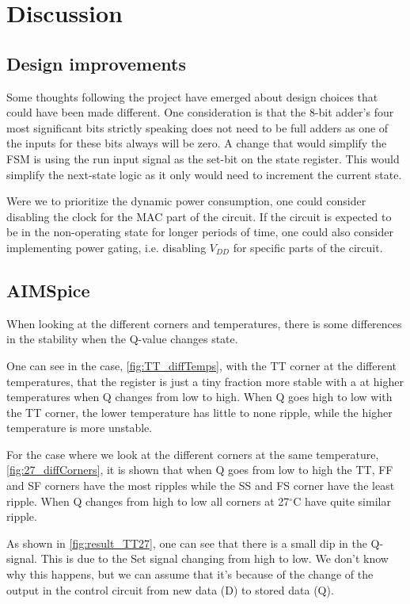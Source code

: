 \section{Discussion}
\label{sec: Discussion}

\subsection{Design improvements}

Some thoughts following the project have emerged about design choices that could have been made different. One consideration is that the 8-bit adder's four most significant bits strictly speaking does not need to be full adders as one of the inputs for these bits always will be zero. A change that would simplify the FSM is using the run input signal as the set-bit on the state register. This would simplify the next-state logic as it only would need to increment the current state.

Were we to prioritize the dynamic power consumption, one could consider disabling the clock for the MAC part of the circuit. If the circuit is expected to be in the non-operating state for longer periods of time, one could also consider implementing power gating, i.e. disabling $V_{DD}$ for specific parts of the circuit.

\subsection{AIMSpice}

When looking at the different corners and temperatures, there is some differences in the stability when the Q-value changes state. 

One can see in the case, \autoref{fig:TT_diffTemps}, with the TT corner at the different temperatures, that the register is just a tiny fraction more stable with a at higher temperatures when Q changes from low to high. When Q goes high to low with the TT corner, the lower temperature has little to none ripple, while the higher temperature is more unstable. 

For the case where we look at the different corners at the same temperature, \autoref{fig:27_diffCorners}, it is shown that when Q goes from low to high the TT, FF and SF corners have the most ripples while the SS and FS corner have the least ripple. When Q changes from high to low all corners at 27$^\circ$C have quite similar ripple. 

As shown in \autoref{fig:result_TT27}, one can see that there is a small dip in the Q-signal. This is due to the Set signal changing from high to low. We don't know why this happens, but we can assume that it's because of the change of the output in the control circuit from new data (D) to stored data (Q).

